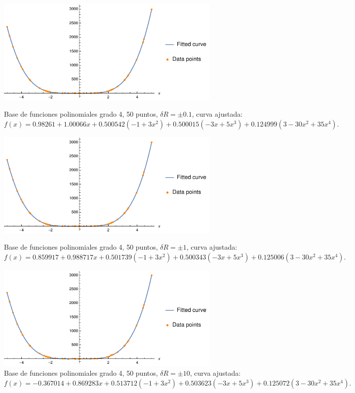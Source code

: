 \documentclass[11pt,letterpaper]{article}
\begin{document}
\begin{figure}
\centering
\includegraphics[width=11cm]{legendre_01}
\caption{Base de funciones polinomiales grado 4, 50 puntos, $\delta R=\pm 0.1$,
curva ajustada: $f(x)=0.98261 + 1.00066 x + 0.500542 (-1 + 3 x^2) + 
 0.500015 (-3 x + 5 x^3) + 0.124999 (3 - 30 x^2 + 35 x^4)$.}
\includegraphics[width=11cm]{legendre_02}
\caption{Base de funciones polinomiales grado 4, 50 puntos, $\delta R=\pm 1$,
curva ajustada: $f(x)=0.859917 + 0.988717 x + 0.501739 (-1 + 3 x^2) + 
 0.500343 (-3 x + 5 x^3) + 0.125006 (3 - 30 x^2 + 35 x^4)$.}
\includegraphics[width=11cm]{legendre_03}
\caption{Base de funciones polinomiales grado 4, 50 puntos, $\delta R=\pm 10$,
curva ajustada: $f(x)=-0.367014 + 0.869283 x + 0.513712 (-1 + 3 x^2) + 
 0.503623 (-3 x + 5 x^3) + 0.125072 (3 - 30 x^2 + 35 x^4)$.}
\label{fig:poly_50pts}
\end{figure}
\end{document}
